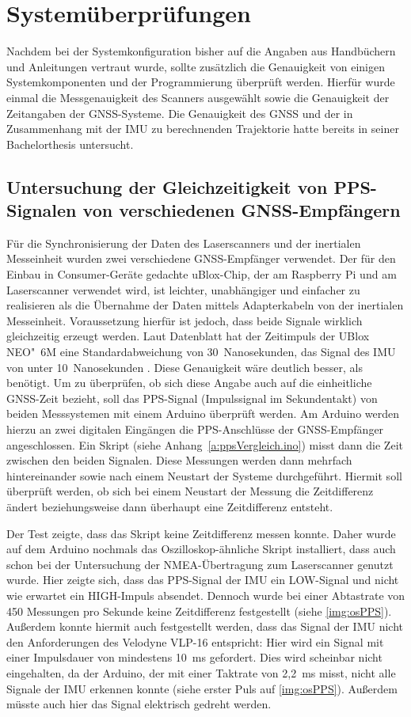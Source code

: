 \documentclass[a4paper,12pt,bibliography=totoc, listof=totoc,titlepage,pointlessnumbers]{scrreprt}
\begin{document}
\chapter{Systemüberprüfungen}
\label{c:systemueberpruefung}
Nachdem bei der Systemkonfiguration bisher auf die Angaben aus Handbüchern und Anleitungen vertraut wurde, sollte zu\-sätz\-lich die Genauigkeit von einigen Systemkomponenten und der Programmierung überprüft werden. Hierfür wurde einmal die Messgenauigkeit des Scanners ausgewählt sowie die Genauigkeit der Zeitangaben der GNSS-Systeme. Die Genauigkeit des GNSS und der in Zusammenhang mit der IMU zu berechnenden Trajektorie hatte bereits \citet{wilken} in seiner Bachelorthesis untersucht.

\section{Untersuchung der Gleichzeitigkeit von PPS-Signalen von verschiedenen GNSS-Empfängern}
Für die Synchronisierung der Daten des Laser\-scan\-ners und der inertialen Messeinheit wurden zwei verschiedene GNSS-Empfänger verwendet. Der für den Einbau in Consumer-Geräte gedachte uBlox-Chip, der am Rasp\-berry Pi und am Laser\-scan\-ner verwendet wird, ist leichter, unabhängiger und einfacher zu realisieren als die Übernahme der Daten mittels Adapterkabeln von der inertialen Messeinheit. Voraussetzung hierfür ist jedoch, dass beide Signale wirklich gleichzeitig erzeugt werden. Laut Datenblatt \citep{ubloxneo} hat der Zeitimpuls der UBlox NEO"~6M eine Standardabweichung von 30~Nanosekunden, das Signal des IMU von unter 10~Nanosekunden \citep{imar}. Diese Genauigkeit wäre deutlich besser, als benötigt. Um zu überprüfen, ob sich diese Angabe auch auf die einheitliche GNSS-Zeit bezieht, soll das PPS-Signal (Impulssignal im Sekundentakt) von beiden Messsystemen mit einem Arduino überprüft werden.
Am Arduino werden hierzu an zwei digitalen Eingängen die PPS-Anschlüsse der GNSS-Empfänger angeschlossen. Ein Skript (siehe Anhang~\ref{a:ppsVergleich.ino}) misst dann die Zeit zwischen den beiden Signalen. Diese Messungen werden dann mehrfach hintereinander sowie nach einem Neustart der Systeme durchgeführt. Hiermit soll überprüft werden, ob sich bei einem Neustart der Messung die Zeitdifferenz ändert beziehungsweise dann überhaupt eine Zeitdifferenz entsteht.

Der Test zeigte, dass das Skript keine Zeitdifferenz messen konnte. Daher wurde auf dem Arduino nochmals das Oszilloskop-ähnliche Skript installiert, dass auch schon bei der Untersuchung der NMEA-Übertragung zum Laserscanner genutzt wurde. Hier zeigte sich, dass das PPS-Signal der IMU ein LOW-Signal und nicht wie erwartet ein HIGH-Impuls absendet. Dennoch wurde bei einer Abtastrate von 450 Messungen pro Sekunde keine Zeitdifferenz festgestellt (siehe \autoref{img:osPPS}). Außerdem konnte hiermit auch festgestellt werden, dass das Signal der IMU nicht den Anforderungen des Velodyne VLP-16 entspricht: Hier wird ein Signal mit einer Impulsdauer von mindestens 10~ms gefordert. Dies wird scheinbar nicht eingehalten, da der Arduino, der mit einer Taktrate von 2,2~ms misst, nicht alle Signale der IMU erkennen konnte (siehe erster Puls auf \autoref{img:osPPS}). Außerdem müsste auch hier das Signal elektrisch gedreht werden.
\end{document}
